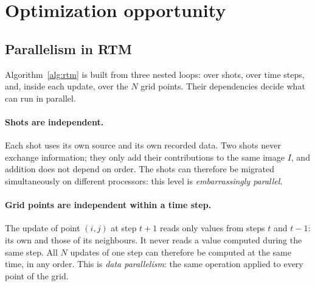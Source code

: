 \documentclass[letterpaper,11pt,leqno]{article}
\begin{document}




\section{Optimization opportunity}

\subsection{Parallelism in RTM}

Algorithm~\ref{alg:rtm} is built from three nested loops: over shots, over
time steps, and, inside each update, over the $N$ grid points. Their
dependencies decide what can run in parallel.

\paragraph{Shots are independent.}
Each shot uses its own source and its own recorded data. Two shots never
exchange information; they only add their contributions to the same image
$I$, and addition does not depend on order. The shots can therefore be
migrated simultaneously on different processors: this level is
\emph{embarrassingly parallel}.

\paragraph{Grid points are independent within a time step.}
The update of point $(i,j)$ at step $t+1$ reads only values from steps $t$
and $t-1$: its own and those of its neighbours. It never reads a value
computed during the same step. All $N$ updates of one step can therefore be
computed at the same time, in any order. This is \emph{data parallelism}:
the same operation applied to every point of the grid.
\end{document}
